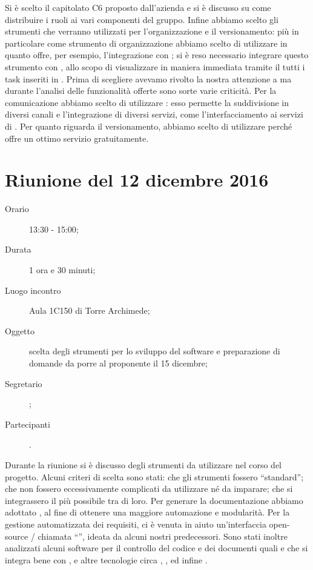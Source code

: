 Si è scelto il capitolato C6 \proj{} proposto dall'azienda \ZU{} e si è discusso su come distribuire i ruoli ai vari componenti del gruppo.
Infine abbiamo scelto gli strumenti che verranno utilizzati per l'organizzazione e il versionamento: più in particolare come strumento di organizzazione abbiamo scelto di utilizzare  in quanto offre, per esempio, l'integrazione con ; si è reso necessario integrare questo strumento con , allo scopo di visualizzare in maniera immediata tramite il  tutti i task inseriti in . Prima di scegliere  avevamo rivolto la nostra attenzione a  ma durante l'analisi delle funzionalità offerte sono sorte varie criticità. Per la comunicazione abbiamo scelto di utilizzare : esso permette la suddivisione in diversi canali e l'integrazione di diversi servizi, come l'interfacciamento ai servizi di . Per quanto riguarda il versionamento, abbiamo scelto di utilizzare   perché offre un ottimo servizio gratuitamente.



\section{Riunione del 12 dicembre 2016}

\begin{description}
	\item[Orario] 13:30 - 15:00;
	\item[Durata] 1 ora e 30 minuti;
	\item[Luogo incontro] Aula 1C150 di Torre Archimede;
	\item[Oggetto] scelta degli strumenti per lo sviluppo del software e preparazione di domande da porre al proponente il 15 dicembre;
	\item[Segretario] \PB; 
	\item[Partecipanti] \ALL.
\end{description}

Durante la riunione si è discusso degli strumenti da utilizzare nel corso del progetto. Alcuni criteri di scelta sono stati: che gli strumenti fossero “standard”; che non fossero eccessivamente complicati da utilizzare né da imparare; che si integrassero il più possibile tra di loro. Per generare la documentazione abbiamo adottato , al fine di ottenere una maggiore automazione e modularità. Per la gestione automatizzata dei requisiti, ci è venuta in aiuto un'interfaccia open-source / chiamata “”, ideata da alcuni nostri predecessori. Sono stati inoltre analizzati alcuni software per il controllo del codice e dei documenti quali  e  che si integra bene con , e altre tecnologie circa , ,  ed infine .

